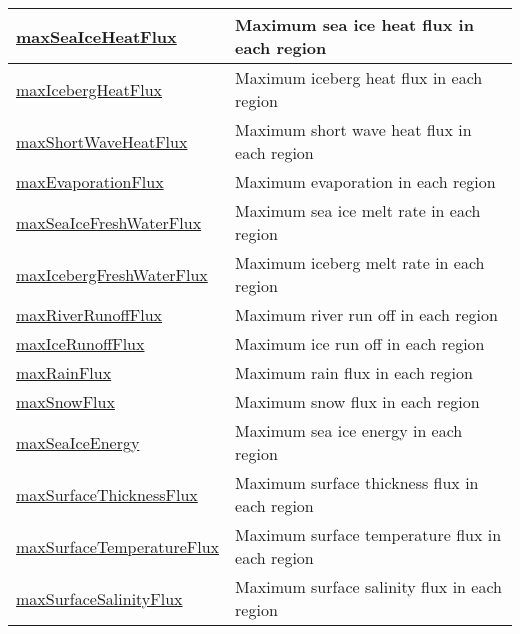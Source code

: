 {\begin{center}
\begin{longtable}{| p{2.0in} | p{4.0in} |}
    \hline
    \hyperref[subsec:var_sec_surfaceAreaWeightedAveragesAM_maxSeaIceHeatFlux]{maxSeaIceHeatFlux} & Maximum sea ice heat flux in each region \\
    \hline
    \hyperref[subsec:var_sec_surfaceAreaWeightedAveragesAM_maxIcebergHeatFlux]{maxIcebergHeatFlux} & Maximum iceberg heat flux in each region \\
    \hline
    \hyperref[subsec:var_sec_surfaceAreaWeightedAveragesAM_maxShortWaveHeatFlux]{maxShortWaveHeatFlux} & Maximum short wave heat flux in each region \\
    \hline
    \hyperref[subsec:var_sec_surfaceAreaWeightedAveragesAM_maxEvaporationFlux]{maxEvaporationFlux} & Maximum evaporation in each region \\
    \hline
    \hyperref[subsec:var_sec_surfaceAreaWeightedAveragesAM_maxSeaIceFreshWaterFlux]{maxSeaIceFreshWaterFlux} & Maximum sea ice melt rate in each region \\
    \hline
    \hyperref[subsec:var_sec_surfaceAreaWeightedAveragesAM_maxIcebergFreshWaterFlux]{maxIcebergFreshWaterFlux} & Maximum iceberg melt rate in each region \\
    \hline
    \hyperref[subsec:var_sec_surfaceAreaWeightedAveragesAM_maxRiverRunoffFlux]{maxRiverRunoffFlux} & Maximum river run off in each region \\
    \hline
    \hyperref[subsec:var_sec_surfaceAreaWeightedAveragesAM_maxIceRunoffFlux]{maxIceRunoffFlux} & Maximum ice run off in each region \\
    \hline
    \hyperref[subsec:var_sec_surfaceAreaWeightedAveragesAM_maxRainFlux]{maxRainFlux} & Maximum rain flux in each region \\
    \hline
    \hyperref[subsec:var_sec_surfaceAreaWeightedAveragesAM_maxSnowFlux]{maxSnowFlux} & Maximum snow flux in each region \\
    \hline
    \hyperref[subsec:var_sec_surfaceAreaWeightedAveragesAM_maxSeaIceEnergy]{maxSeaIceEnergy} & Maximum sea ice energy in each region \\
    \hline
    \hyperref[subsec:var_sec_surfaceAreaWeightedAveragesAM_maxSurfaceThicknessFlux]{maxSurfaceThicknessFlux} & Maximum surface thickness flux in each region \\
    \hline
    \hyperref[subsec:var_sec_surfaceAreaWeightedAveragesAM_maxSurfaceTemperatureFlux]{maxSurfaceTemperatureFlux} & Maximum surface temperature flux in each region \\
    \hline
    \hyperref[subsec:var_sec_surfaceAreaWeightedAveragesAM_maxSurfaceSalinityFlux]{maxSurfaceSalinityFlux} & Maximum surface salinity flux in each region \\

\end{longtable}
\end{center}}
